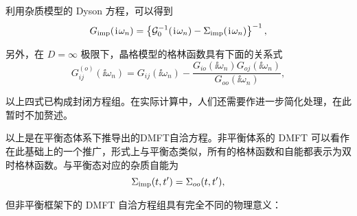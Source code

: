 利用杂质模型的 Dyson 方程，可以得到 
\begin{equation}
    G_{\mathrm{imp}}(\hspace{0.1em}\mathrm{i}\hspace{0.1em}\omega_n)=\left\{ \mathcal{G}_0^{-1}(\hspace{0.1em}\mathrm{i}\hspace{0.1em}\omega_n)-\Sigma_{\mathrm{imp}}(\hspace{0.1em}\mathrm{i}\hspace{0.1em}\omega_n) \right\}^{-1},\label{dmftscf3}
\end{equation}

另外，在 $D=\infty$ 极限下，晶格模型的格林函数具有下面的关系式\cite{PhysRevB.77.235106} 
\begin{equation}
    G_{ij}^{(o)}(\ii\omega_n)=G_{ij}(\ii\omega_n)-\frac{G_{io}(\ii\omega_n)G_{oj}(\ii\omega_n)}{G_{oo}(\ii\omega_n)},\label{lattice-G}
\end{equation}

以上四式已构成封闭方程组。在实际计算中，人们还需要作进一步简化处理，在此暂时不加赘述。


以上是在平衡态体系下推导出的DMFT自洽方程。非平衡体系的 DMFT 可以看作在此基础上的一个推广，形式上与平衡态类似，所有的格林函数和自能都表示为双时格林函数。与平衡态对应的杂质自能为 
\begin{equation}
    \Sigma_{\mathrm{imp}}(t, t')=\Sigma_{oo}(t,t'),
\end{equation}

但非平衡框架下的 DMFT 自洽方程组具有完全不同的物理意义：